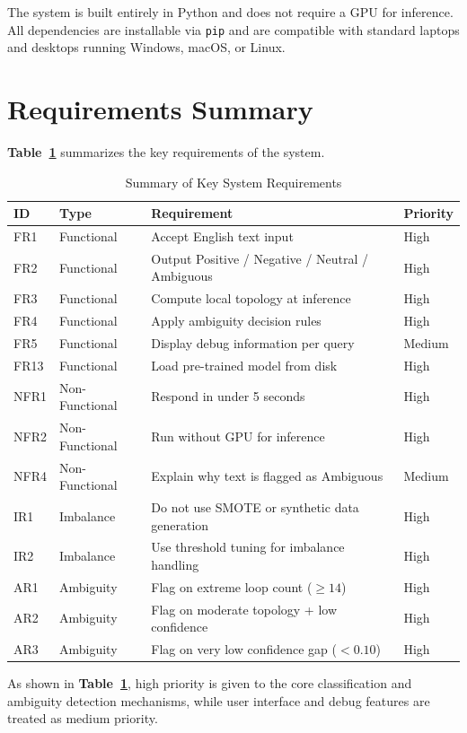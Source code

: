 The system is built entirely in Python and does not require a GPU for inference. All dependencies
are installable via \texttt{pip} and are compatible with standard laptops and desktops running
Windows, macOS, or Linux.

\section{Requirements Summary}

\textbf{Table~\ref{tab:req_summary}} summarizes the key requirements of the system.

\begin{table}[H]
\centering
\caption{Summary of Key System Requirements}
\label{tab:req_summary}
\begin{tabular}{llp{7cm}l}
\toprule
\textbf{ID} & \textbf{Type} & \textbf{Requirement} & \textbf{Priority} \\
\midrule
FR1  & Functional     & Accept English text input                              & High   \\
FR2  & Functional     & Output Positive / Negative / Neutral / Ambiguous       & High   \\
FR3  & Functional     & Compute local topology at inference                    & High   \\
FR4  & Functional     & Apply ambiguity decision rules                         & High   \\
FR5  & Functional     & Display debug information per query                    & Medium \\
FR13 & Functional     & Load pre-trained model from disk                       & High   \\
NFR1 & Non-Functional & Respond in under 5 seconds                             & High   \\
NFR2 & Non-Functional & Run without GPU for inference                          & High   \\
NFR4 & Non-Functional & Explain why text is flagged as Ambiguous               & Medium \\
IR1  & Imbalance      & Do not use SMOTE or synthetic data generation          & High   \\
IR2  & Imbalance      & Use threshold tuning for imbalance handling            & High   \\
AR1  & Ambiguity      & Flag on extreme loop count ($\geq 14$)                 & High   \\
AR2  & Ambiguity      & Flag on moderate topology + low confidence             & High   \\
AR3  & Ambiguity      & Flag on very low confidence gap ($< 0.10$)             & High   \\
\bottomrule
\end{tabular}
\end{table}

As shown in \textbf{Table~\ref{tab:req_summary}}, high priority is given to the core classification and
ambiguity detection mechanisms, while user interface and debug features are treated as medium
priority.
